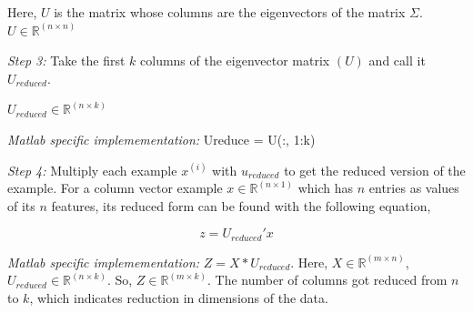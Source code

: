 \noindent Here, $ U $ is the matrix whose columns are the eigenvectors of the matrix $ \Sigma $.
$ U \in \mathbb{R}^{(n \times n)} $

\vspace{0.5cm}

\noindent \emph{Step 3:} Take the first $ k $ columns of the eigenvector matrix $ (U) $ and call
it $ U_{reduced} $. 

\noindent $ U_{reduced} \in \mathbb{R}^{(n \times k)} $

\vspace{0.25cm}

\noindent \emph{Matlab specific implemementation:} Ureduce = U(:, 1:k)

\vspace{0.5cm}

\noindent \emph{Step 4:} Multiply each example $ x^{(i)} $ with $ u_{reduced} $ to get the reduced
version of the example. For a column vector example $ x \in \mathbb{R}^{(n \times 1)} $ which has 
$ n $ entries as values of its $ n $ features, its reduced form can be found with the following equation,

\begin{equation}
	z = U_{reduced}' x
\end{equation}

\vspace{0.25cm}

\noindent \emph{Matlab specific implemementation:} $ Z = X * U_{reduced} $.
Here, $ X \in \mathbb{R}^{(m \times n)} $, $ U_{reduced} \in \mathbb{R}^{(n \times k)} $. So,
$ Z \in \mathbb{R}^{(m \times k)} $. The number of columns got reduced from $ n $ to $ k $, which
indicates reduction in dimensions of the data.


